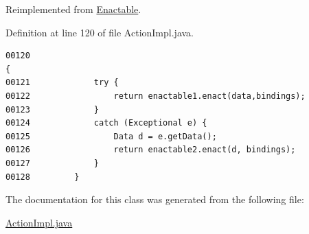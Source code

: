 Reimplemented from \hyperlink{interfaceEnactable_a0}{Enactable}.

Definition at line 120 of file Action\-Impl.java.\footnotesize\begin{verbatim}00120                                                                                    {
00121             try {
00122                 return enactable1.enact(data,bindings);
00123             }
00124             catch (Exceptional e) {
00125                 Data d = e.getData();
00126                 return enactable2.enact(d, bindings);
00127             }
00128         }
\end{verbatim}\normalsize 


The documentation for this class was generated from the following file:\begin{CompactItemize}
\item 
\hyperlink{ActionImpl_8java-source}{Action\-Impl.java}\end{CompactItemize}
